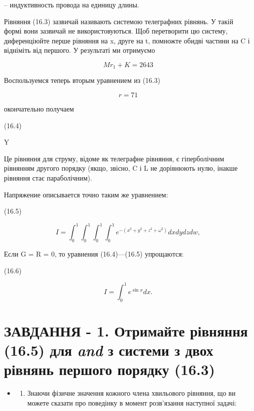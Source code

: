 \documentclass[
  ukrainian,
]{article}
\providecommand{\tightlist}{%
  \setlength{\itemsep}{0pt}\setlength{\parskip}{0pt}}
\begin{document}
-- индуктивность провода на единицу длины.

Рівняння (16.3) зазвичай називають системою телеграфних рівнянь. У такій
формі вони зазвичай не використовуються. Щоб перетворити цю систему,
диференціюйте перше рівняння на x, друге на t, помножте обидві частини
на C і відніміть від першого. У результаті ми отримуємо

\[
Mr_1 + K = 2643
\]

Воспользуемся теперь вторым уравнением из (16.3)

\[
r = 71
\]

окончательно получаем

(16.4)

Y

Це рівняння для струму, відоме як телеграфне рівняння, є гіперболічним
рівнянням другого порядку (якщо, звісно, C і L не дорівнюють нулю,
інакше рівняння стає параболічним).

Напряжение описывается точно таким же уравнением:

(16.5)

\[
I = \int_{0}^{1} \int_{0}^{1} \int_{0}^{1} \int_{0}^{1} e^{-(x^{2}+y^{2}+z^{2}+\omega^{2})} dx dy dz dw,
\]

Если G = R = 0, то уравнения (16.4)---(16.5) упрощаются:

(16.6)

\[
I = \int_{0}^{1} e^{\sin x} dx.
\]

\section{\texorpdfstring{ЗАВДАННЯ - 1. Отримайте рівняння (16.5) для
\emph{and} з системи з двох рівнянь першого порядку
(16.3)}{ЗАВДАННЯ - 1. Отримайте рівняння (16.5) для and з системи з двох рівнянь першого порядку (16.3)}}\label{ux437ux430ux432ux434ux430ux43dux43dux44f---1.-ux43eux442ux440ux438ux43cux430ux439ux442ux435-ux440ux456ux432ux43dux44fux43dux43dux44f-16.5-ux434ux43bux44f-and-ux437-ux441ux438ux441ux442ux435ux43cux438-ux437-ux434ux432ux43eux445-ux440ux456ux432ux43dux44fux43dux44c-ux43fux435ux440ux448ux43eux433ux43e-ux43fux43eux440ux44fux434ux43aux443-16.3}

\begin{itemize}
\tightlist
\item
  \begin{enumerate}
  \def\labelenumi{\arabic{enumi}.}
  \setcounter{enumi}{1}
  \tightlist
  \item
    Знаючи фізичне значення кожного члена хвильового рівняння, що ви
    можете сказати про поведінку в момент розв'язання наступної задачі:
  \end{enumerate}
\end{itemize}
\end{document}
